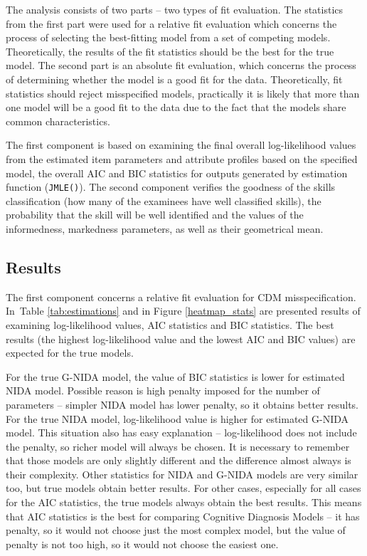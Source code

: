\documentclass[english]{pwr_wmat_praca_dyplomowa}
\theoremstyle{plain}
\theoremstyle{definition}
\numberwithin{theorem}{chapter}
\begin{document}
The analysis consists of two parts -- two types of ﬁt evaluation. The statistics from the first part were used for a relative ﬁt evaluation which concerns the process of selecting the best-ﬁtting model from a set of competing models. Theoretically, the results of the fit statistics should be the best for the true model. The second part is an absolute fit evaluation, which concerns the process of determining whether the model is a good fit for the data. Theoretically, fit statistics should reject misspeciﬁed models, practically it is likely that more than one model will be a good fit to the data due to the fact that the models share common characteristics. 

The first component is based on examining the final overall log-likelihood values from the estimated item parameters and attribute profiles based on the specified model, the overall AIC and BIC statistics for outputs generated by estimation function (\texttt{JMLE()}). The second component verifies the goodness of the skills classification (how many of the examinees have well classified skills), the probability that the skill will be well identified and the values of the informedness, markedness parameters, as well as their geometrical mean. 

\subsection{Results}

The first component concerns a relative ﬁt evaluation for CDM misspecification. In~Table \ref{tab:estimations} and in Figure \ref{heatmap_stats} are presented results of examining log-likelihood values, AIC statistics and BIC statistics. The best results (the highest log-likelihood value and the lowest AIC and BIC values) are expected for the true models. 

For the true G-NIDA model, the value of BIC statistics is lower for estimated NIDA model. Possible reason is high penalty imposed for the number of parameters -- simpler NIDA model has lower penalty, so it obtains better results. For the true NIDA model, log-likelihood value is higher for estimated G-NIDA model. This situation also has easy explanation -- log-likelihood does not include the penalty, so richer model will always be chosen. It is necessary to remember that those models are only slightly different and the difference almost always is their complexity. Other statistics for NIDA and G-NIDA models are very similar too, but true models obtain better results. For other cases, especially for all cases for the AIC statistics, the true models always obtain the best results. This means that AIC statistics is the best for comparing Cognitive Diagnosis Models -- it has penalty, so it would not choose just the most complex model, but the value of penalty is not too high, so it would not choose the easiest one. 
\end{document}
